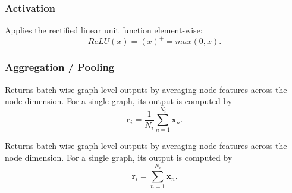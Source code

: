 \documentclass{article}
\begin{document}
    \subsubsection{Activation} %
    \label{sec:activation}

    \begin{definition}
       Applies the rectified linear unit function element-wise:
       \[
        ReLU(x)=(x)^+=max(0,x)
       .\]
    \end{definition}

    \subsubsection{Aggregation / Pooling} %
    \label{sec:aggregation}

    \begin{definition}
        Returns batch-wise graph-level-outputs by averaging node features across the node dimension. For a single graph, its output is computed by
        \[
           \mathbf{r}_i = \frac{1}{N_i} \sum_{n=1}^{N_i} \mathbf{x}_n
        .\]

    \end{definition}

    \begin{definition}
        Returns batch-wise graph-level-outputs by averaging node features across the node dimension. For a single graph, its output is computed by
        \[
            \mathbf{r}_i = \sum_{n=1}^{N_i} \mathbf{x}_n
        .\]

    \end{definition}


\end{document}
